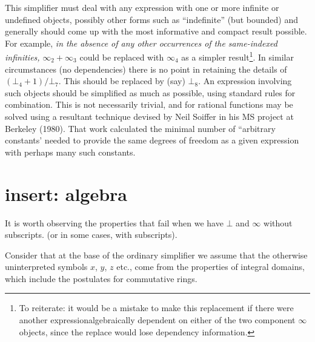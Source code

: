 \documentclass{article}
\begin{document}
This simplifier must deal with any expression with one or more
infinite or undefined objects, possibly other forms such as
``indefinite'' (but bounded) and generally should come up with the
most informative and compact result possible.  For example, {\em in
the absence of any other occurrences of the same-indexed infinities,}
$\infty_2+\infty_3$ could be replaced with $\infty_4$ as a simpler
result\footnote{ To reiterate: it would be a mistake to make this
replacement if there were another expressionalgebraically dependent on
either of the two component $\infty$ objects, since the replace would
lose dependency information.}.  In similar circumstances (no
dependencies) there is no point in retaining the details of
$(\bot_4+1)/\bot_7$.  This should be replaced by (say) $\bot_8$.  An
expression involving such objects should be simplified as much as
possible, using standard rules for combination.
This is not necessarily trivial, and for rational functions
may be solved using a resultant technique devised by Neil Soiffer in
his MS project at Berkeley (1980). That work calculated the minimal
number of ``arbitrary constants' needed to provide the same degrees of
freedom as a given expression with perhaps many such constants.

\section{insert: algebra}
It is worth observing the properties that fail when we have $\bot$ and
$\infty$ without subscripts. (or in some cases, with subscripts).

Consider that at the base of the ordinary simplifier we assume that
the otherwise uninterpreted symbols $x$, $y$, $z$ etc., come from the properties
of integral domains, which include the postulates for commutative rings.
\end{document}
